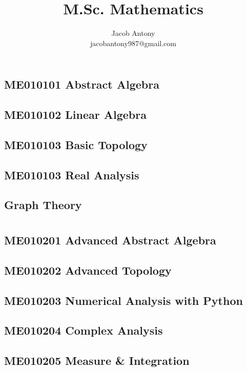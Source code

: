\documentclass[a4paper,10pt,openany]{book}
\title{M.Sc. Mathematics}
\author{Jacob Antony\\jacobantony987@gmail.com}
\begin{document}
\part{}
\chapter{ME010101 Abstract Algebra}

\chapter{ME010102 Linear Algebra}

\chapter{ME010103 Basic Topology}

\chapter{ME010103 Real Analysis}

\chapter{Graph Theory}


\part{}
\chapter{ME010201 Advanced Abstract Algebra}

\chapter{ME010202 Advanced Topology}

\chapter{ME010203 Numerical Analysis with Python}

\chapter{ME010204 Complex Analysis}

\chapter{ME010205 Measure \& Integration}

\end{document}
